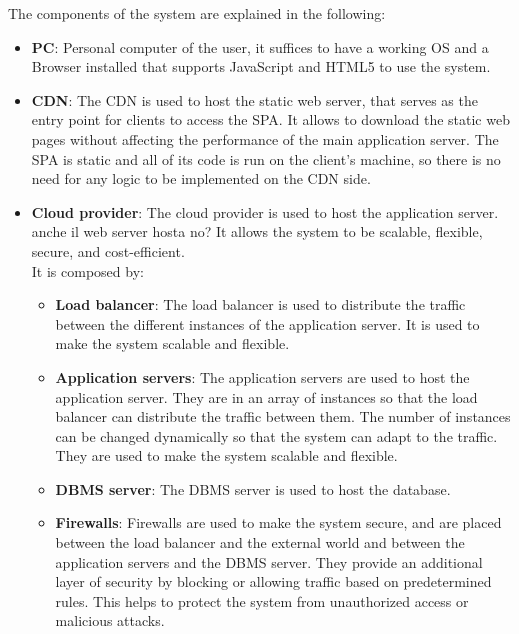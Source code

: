 The components of the system are explained in the following:
\begin{itemize}
    \item \textbf{PC}: Personal computer of the user, it suffices to have a working OS and a Browser installed that supports JavaScript and HTML5 to use the system.
    \item \textbf{CDN}: The CDN is used to host the static web server, that serves as the entry point for clients to access the SPA. 
                        It allows to download the static web pages without affecting the performance of the main application server. 
                        The SPA is static and all of its code is run on the client's machine, so there is no need for any logic to be implemented on the CDN side.
    \item \textbf{Cloud provider}: The cloud provider is used to host the application server. {\color{red} anche il web server hosta no?} 
                                   It allows the system to be scalable, flexible, secure, and cost-efficient.\\
          It is composed by:
          \begin{itemize}
              \item \textbf{Load balancer}: The load balancer is used to distribute the traffic between the different instances of the application server. 
                                            It is used to make the system scalable and flexible.
              \item \textbf{Application servers}: The application servers are used to host the application server. 
                                                  They are in an array of instances so that the load balancer can distribute the traffic between them. 
                                                  The number of instances can be changed dynamically so that the system can adapt to the traffic. 
                                                  They are used to make the system scalable and flexible.
              \item \textbf{DBMS server}: The DBMS server is used to host the database.
              \item \textbf{Firewalls}: Firewalls are used to make the system secure, and are placed between the load balancer and the external world and between the application servers and the DBMS server. 
                                        They provide an additional layer of security by blocking or allowing traffic based on predetermined rules. 
                                        This helps to protect the system from unauthorized access or malicious attacks.
          \end{itemize}
\end{itemize}

